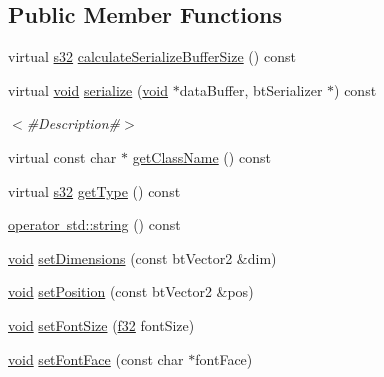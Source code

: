 \subsection*{Public Member Functions}
\begin{DoxyCompactItemize}
\item 
virtual \mbox{\hyperlink{_util_8h_aa62c75d314a0d1f37f79c4b73b2292e2}{s32}} \mbox{\hyperlink{classnjli_1_1_checkbox_h_u_d_a51fbe982b583328b8b73299d75d5fe83}{calculate\+Serialize\+Buffer\+Size}} () const
\item 
virtual \mbox{\hyperlink{_thread_8h_af1e856da2e658414cb2456cb6f7ebc66}{void}} \mbox{\hyperlink{classnjli_1_1_checkbox_h_u_d_aa5edf29add89b86e7dd15ab5c91625f4}{serialize}} (\mbox{\hyperlink{_thread_8h_af1e856da2e658414cb2456cb6f7ebc66}{void}} $\ast$data\+Buffer, bt\+Serializer $\ast$) const
\begin{DoxyCompactList}\small\item\em $<$\#\+Description\#$>$ \end{DoxyCompactList}\item 
virtual const char $\ast$ \mbox{\hyperlink{classnjli_1_1_checkbox_h_u_d_a51763018df640c7b4a4d674ba6bf2cfa}{get\+Class\+Name}} () const
\item 
virtual \mbox{\hyperlink{_util_8h_aa62c75d314a0d1f37f79c4b73b2292e2}{s32}} \mbox{\hyperlink{classnjli_1_1_checkbox_h_u_d_a5877b7c1c680c535d1d0878f36a0bbc5}{get\+Type}} () const
\item 
\mbox{\hyperlink{classnjli_1_1_checkbox_h_u_d_a40b9fbfcc7a86278467503de2aab953d}{operator std\+::string}} () const
\item 
\mbox{\hyperlink{_thread_8h_af1e856da2e658414cb2456cb6f7ebc66}{void}} \mbox{\hyperlink{classnjli_1_1_checkbox_h_u_d_a1f5298769d6467f4333a6fa208131ccd}{set\+Dimensions}} (const bt\+Vector2 \&dim)
\item 
\mbox{\hyperlink{_thread_8h_af1e856da2e658414cb2456cb6f7ebc66}{void}} \mbox{\hyperlink{classnjli_1_1_checkbox_h_u_d_aaa1068b0211ba419f36dfb3b10e726b3}{set\+Position}} (const bt\+Vector2 \&pos)
\item 
\mbox{\hyperlink{_thread_8h_af1e856da2e658414cb2456cb6f7ebc66}{void}} \mbox{\hyperlink{classnjli_1_1_checkbox_h_u_d_a4063a85d6fb9bc70311171465efa7025}{set\+Font\+Size}} (\mbox{\hyperlink{_util_8h_a5f6906312a689f27d70e9d086649d3fd}{f32}} font\+Size)
\item 
\mbox{\hyperlink{_thread_8h_af1e856da2e658414cb2456cb6f7ebc66}{void}} \mbox{\hyperlink{classnjli_1_1_checkbox_h_u_d_ae4b99948d4cc44e2ddd6f1b8b2e6cbf0}{set\+Font\+Face}} (const char $\ast$font\+Face)

\end{DoxyCompactItemize}
